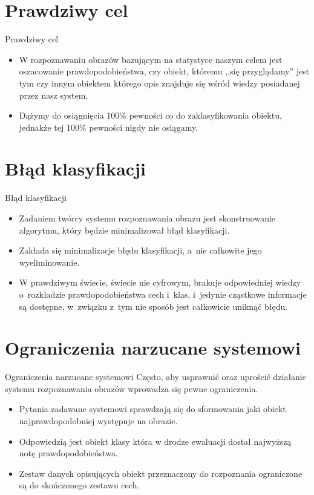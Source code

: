 \documentclass{beamer}
\begin{document}
\section{Prawdziwy cel}
\begin{frame}{Prawdziwy cel}
\begin{itemize}
\item W rozpoznawaniu obrazów bazującym na statystyce naszym celem jest oszacowanie prawdopodobieństwa, czy obiekt, któremu ,,się przyglądamy'' jest tym czy innym obiektem którego opis znajduje się wśród wiedzy posiadanej przez nasz system. 
\pause
\item Dążymy do osiągnięcia 100\% pewności co do zaklasyfikowania obiektu, jednakże tej 100\% pewności nigdy nie osiągamy.
\end{itemize}
\end{frame}


\section{Błąd klasyfikacji}
\begin{frame}{Błąd klasyfikacji}
\begin{itemize}
\item Zadaniem twórcy systemu rozpoznawania obrazu jest skonstruowanie algorytmu, który będzie minimalizował błąd klasyfikacji.
\pause
\item Zakłada się minimalizacje błędu klasyfikacji, a~nie całkowite jego wyeliminowanie.
\pause
\item W prawdziwym świecie, świecie nie cyfrowym, brakuje odpowiedniej wiedzy o~rozkładzie prawdopodobieństwa cech i~klas, i~jedynie cząstkowe informacje są dostępne, w~związku z~tym nie sposób jest całkowicie uniknąć błędu.
\end{itemize}
\end{frame}


\section{Ograniczenia narzucane systemowi}
\begin{frame}{Ograniczenia narzucane systemowi}
Często, aby usprawnić oraz uprościć działanie systemu rozpoznawania obrazów wprowadza się pewne ograniczenia.
\pause
\begin{itemize}
\item Pytania zadawane systemowi sprawdzają się do sformowania jaki obiekt najprawdopodobniej występuje na obrazie.
\pause
\item Odpowiedzią jest obiekt klasy która w drodze ewaluacji dostał najwyższą notę prawdopodobieństwa.
\pause
\item Zestaw danych opisujących obiekt przeznaczony do rozpoznania ograniczone są do skończonego zestawu cech.
\end{itemize}
\end{frame}
\end{document}
